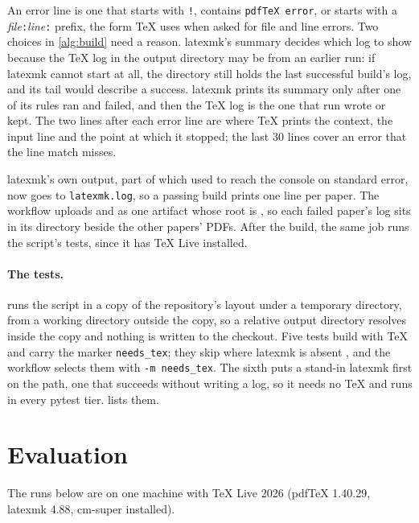 \documentclass[11pt]{article}
\theoremstyle{plain}
\theoremstyle{definition}
\newcommand{\code}[1]{\texttt{#1}}
\begin{document}
An error line is one that starts with \code{!}, contains \code{pdfTeX error}, or starts with a
\textit{file}\code{:}\textit{line}\code{:} prefix, the form TeX uses when asked for file and line
errors. Two choices in \cref{alg:build} need a reason. latexmk's summary decides which log
to show because the TeX log in the output directory may be from an earlier run: if latexmk cannot
start at all, the directory still holds the last successful build's log, and its tail would
describe a success. latexmk prints its summary only after one of its rules ran and failed, and then
the TeX log is the one that run wrote or kept. The two lines after each error line are where TeX
prints the context, the input line and the point at which it stopped; the last 30 lines cover an
error that the line match misses.

latexmk's own output, part of which used to reach the console on standard error, now goes to
\code{latexmk.log}, so a passing build prints one line per paper. The workflow uploads
 and  as one artifact whose root
is  \cite{uploadartifact}, so each failed paper's log sits in its directory
beside the other papers' PDFs. After the build, the same job runs the script's tests, since it has
TeX Live installed.

\paragraph{The tests.}  runs the script in a copy
of the repository's layout under a temporary directory, from a working directory outside the copy,
so a relative output directory resolves inside the copy and nothing is written to the checkout.
Five tests build with TeX and carry the marker \code{needs\_tex}; they skip where latexmk is
absent \cite{pytestdocs}, and the workflow selects them with \code{-m needs\_tex}. The sixth puts a
stand-in latexmk first on the path, one that succeeds without writing a log, so it needs no TeX and
runs in every pytest tier.  lists them.

\section{Evaluation}\label{sec:eval}
The runs below are on one machine with TeX Live 2026 (pdfTeX 1.40.29, latexmk 4.88, cm-super
installed).
\end{document}
